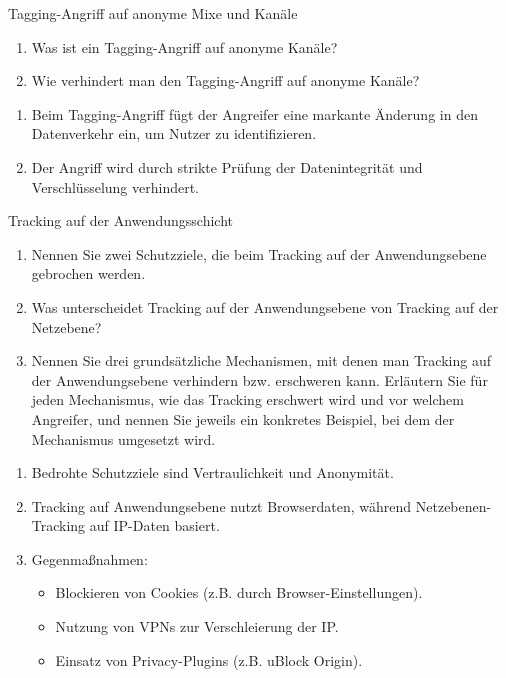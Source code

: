 \documentclass{article}
\begin{document}
\setcounter{subsection}{2310}
\begin{exercise}{Tagging-Angriff auf anonyme Mixe und Kanäle}
  \begin{enumerate}
    \item Was ist ein Tagging-Angriff auf anonyme Kanäle?
    \item Wie verhindert man den Tagging-Angriff auf anonyme Kanäle?
  \end{enumerate}

  \begin{solution}
    \begin{enumerate}
      \item Beim Tagging-Angriff fügt der Angreifer eine markante Änderung in den Datenverkehr ein, um Nutzer zu identifizieren.
      \item Der Angriff wird durch strikte Prüfung der Datenintegrität und Verschlüsselung verhindert.
    \end{enumerate}
  \end{solution}
\end{exercise}

\begin{exercise}{Tracking auf der Anwendungsschicht}
  \begin{enumerate}
    \item Nennen Sie zwei Schutzziele, die beim Tracking auf der Anwendungsebene gebrochen werden.
    \item Was unterscheidet Tracking auf der Anwendungsebene von Tracking auf der Netzebene?
    \item Nennen Sie drei grundsätzliche Mechanismen, mit denen man Tracking auf der Anwendungsebene verhindern bzw. erschweren kann. Erläutern Sie für jeden Mechanismus, wie das Tracking erschwert wird und vor welchem Angreifer, und nennen Sie jeweils ein konkretes Beispiel, bei dem der Mechanismus umgesetzt wird.
  \end{enumerate}

  \begin{solution}
    \begin{enumerate}
      \item Bedrohte Schutzziele sind Vertraulichkeit und Anonymität.
      \item Tracking auf Anwendungsebene nutzt Browserdaten, während Netzebenen-Tracking auf IP-Daten basiert.
      \item Gegenmaßnahmen:
        \begin{itemize}
          \item Blockieren von Cookies (z.B. durch Browser-Einstellungen).
          \item Nutzung von VPNs zur Verschleierung der IP.
          \item Einsatz von Privacy-Plugins (z.B. uBlock Origin).
        \end{itemize}
    \end{enumerate}
  \end{solution}
\end{exercise}
\end{document}
